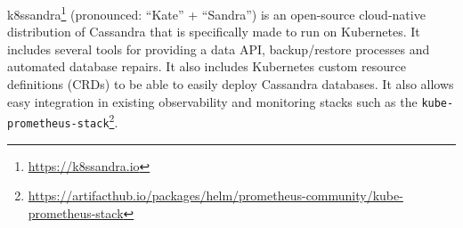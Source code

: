 k8ssandra\footnote{\url{https://k8ssandra.io}} (pronounced: ``Kate'' +  ``Sandra'') is an open-source cloud-native distribution of Cassandra that is specifically made to run on Kubernetes. It includes several tools for providing a data API, backup/restore processes and automated database repairs. It also includes Kubernetes custom resource definitions (CRDs) to be able to easily deploy Cassandra databases. It also allows easy integration in existing observability and monitoring stacks such as the \texttt{kube-prometheus-stack}\footnote{\raggedright\url{https://artifacthub.io/packages/helm/prometheus-community/kube-prometheus-stack}}.
